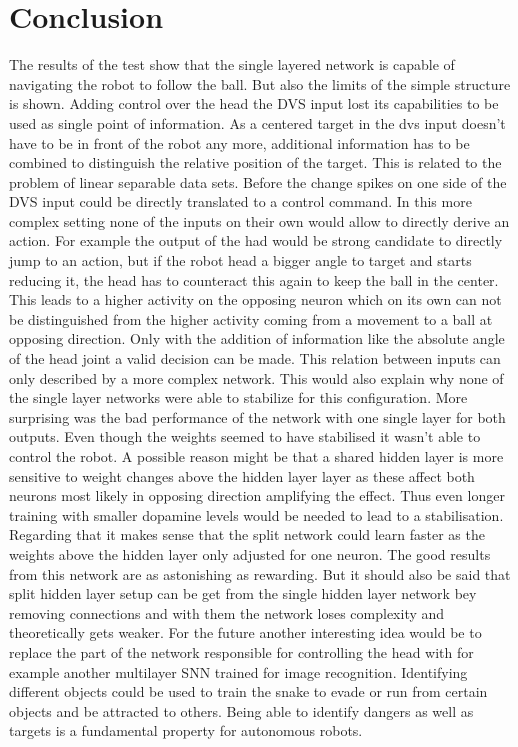 \chapter{Conclusion}
The results of the test show that the single layered network is capable of navigating the robot to follow the ball. But also the limits of the simple structure is shown. Adding control over the head the DVS input lost its capabilities to be used as single point of information. As a centered target in the dvs input doesn't have to be in front of the robot any more, additional information has to be combined to distinguish the relative position of the target. This is related to the problem of linear separable data sets. Before the change spikes on one side of the DVS input could be directly translated to a control command. In this more complex setting none of the inputs on their own would allow to directly derive an action. For example the output of the had would be strong candidate to directly jump to an action, but if the robot head a bigger angle to target and starts reducing it, the head has to counteract this again to keep the ball in the center. This leads to a higher activity on the opposing neuron which on its own can not be distinguished from the higher activity coming from a movement to a ball at opposing direction. Only with the addition of information like the absolute angle of the head joint a valid decision can be made. This relation between inputs can only described by a more complex network. This would also explain why none of the single layer networks were able to stabilize for this configuration. More surprising was the bad performance of the network with one single layer for both outputs. Even though the weights seemed to have stabilised it wasn't able to control the robot. A possible reason might be that a shared hidden layer is more sensitive to weight changes above the hidden layer layer as these affect both neurons most likely in opposing direction amplifying the effect. Thus even longer training with smaller dopamine levels would be needed to lead to a stabilisation.
Regarding that it makes sense that the split network could learn faster as the weights above the hidden layer only adjusted for one neuron. The good results from this network are as astonishing as rewarding. But it should also be said that split hidden layer setup can be get from the single hidden layer network bey removing connections and with them the network loses complexity and theoretically gets weaker.
For the future another interesting idea would be to replace the part of the network responsible for controlling the head with for example another multilayer SNN trained for image recognition. Identifying different objects could be used to train the snake to evade or run from certain objects and be attracted to others. Being able to identify dangers as well as targets is a fundamental property for autonomous robots. 



